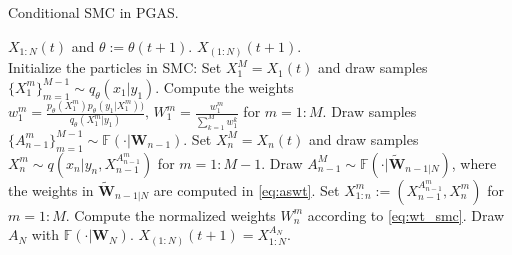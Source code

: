 \documentclass[12pt]{article}
\begin{document}
\begin{algorithm} %
\caption{Conditional SMC in PGAS.} 
\label{alg:pgas} %
\begin{algorithmic} [1]  %
    \REQUIRE  $X_{1:N}(t)$ and  $\theta:=\theta(t+1)$. 
     \ENSURE $X_{(1:N)}(t+1)$.  \\
     Initialize the particles in SMC: 
     \STATE \hspace{3mm}  Set $X_1^M= X_{1}(t)$ and draw samples $\{X_1^m\}_{m=1}^{M-1} \sim q_\theta(x_1| y_1)$.
     \STATE \hspace{3mm}   Compute the weights %
     $w_{1}^m =\frac{p_\theta(X^m_1)p_\theta(y_1|X_1^m))}{q_\theta(X_1^m |y_1)},\, W_{1}^m= \frac{w_1^m}{\sum_{k=1}^Mw_{1}^k}$ for $m=1:M$.
            \STATE  Draw samples $\{A_{n-1}^m\}_{m=1}^{M-1}\sim \mathbb{F}(\cdot | \mathbf{W}_{n-1})$. 
            \STATE  Set $X_{n}^M= X_{n}(t)$ and draw samples $X_{n}^m\sim q(x_n|y_n, X_{n-1}^{A_{n-1}^m} )$ for $m=1:M-1$.
            \STATE Draw $A_{n-1}^M \sim  \mathbb{F}(\cdot | \widetilde{\mathbf{W}}_{n-1|N})$, where the weights in $ \widetilde{\mathbf{W}}_{n-1|N}$ are computed in \eqref{eq:aswt}.  \label{lnum:pgas}
            \STATE Set $X_{1:n}^{m} := (X_{n-1}^{A_{n-1}^m}, X_n^m)$ for $m=1:M$. 
            \STATE Compute the normalized weights $W_n^m$ according to \eqref{eq:wt_smc}. 
    \ENDFOR     
    \STATE Draw $A_N$ with  $\mathbb{F}(\cdot | \mathbf{W}_{N})$.
    \RETURN $X_{(1:N)}(t+1) = X_{1:N}^{A_N}$. 
     \end{algorithmic}
\end{algorithm}
\end{document}
